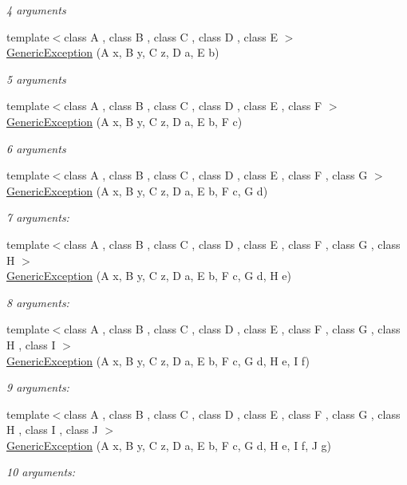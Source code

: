 \begin{DoxyCompactItemize}
\begin{DoxyCompactList}\small\item\em 4 arguments \end{DoxyCompactList}\item 
{\footnotesize template$<$class A , class B , class C , class D , class E $>$ }\\\hyperlink{classGenericException_a873e816a83f751d79b527cfc91224946}{Generic\-Exception} (A x, B y, C z, D a, E b)
\begin{DoxyCompactList}\small\item\em 5 arguments \end{DoxyCompactList}\item 
{\footnotesize template$<$class A , class B , class C , class D , class E , class F $>$ }\\\hyperlink{classGenericException_af68703d73dded955ed84972ac86cb292}{Generic\-Exception} (A x, B y, C z, D a, E b, F c)
\begin{DoxyCompactList}\small\item\em 6 arguments \end{DoxyCompactList}\item 
{\footnotesize template$<$class A , class B , class C , class D , class E , class F , class G $>$ }\\\hyperlink{classGenericException_a0d50da47c2103e306fab8c7976961954}{Generic\-Exception} (A x, B y, C z, D a, E b, F c, G d)
\begin{DoxyCompactList}\small\item\em 7 arguments\-: \end{DoxyCompactList}\item 
{\footnotesize template$<$class A , class B , class C , class D , class E , class F , class G , class H $>$ }\\\hyperlink{classGenericException_a59fefdaacf2b5d0f094340e5855d8ee4}{Generic\-Exception} (A x, B y, C z, D a, E b, F c, G d, H e)
\begin{DoxyCompactList}\small\item\em 8 arguments\-: \end{DoxyCompactList}\item 
{\footnotesize template$<$class A , class B , class C , class D , class E , class F , class G , class H , class I $>$ }\\\hyperlink{classGenericException_aaaa9839b8f6bf4760c9b48349e68e27a}{Generic\-Exception} (A x, B y, C z, D a, E b, F c, G d, H e, I f)
\begin{DoxyCompactList}\small\item\em 9 arguments\-: \end{DoxyCompactList}\item 
{\footnotesize template$<$class A , class B , class C , class D , class E , class F , class G , class H , class I , class J $>$ }\\\hyperlink{classGenericException_a040d7939f50745cba15a6eba865698e5}{Generic\-Exception} (A x, B y, C z, D a, E b, F c, G d, H e, I f, J g)
\begin{DoxyCompactList}\small\item\em 10 arguments\-: \end{DoxyCompactList}\end{DoxyCompactItemize}
